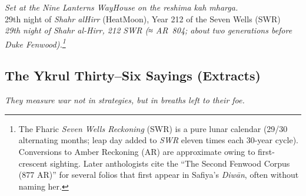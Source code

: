 \documentclass[11pt]{article}
\begin{document}
\begin{flushright}\small
\textit{Set at the Nine Lanterns Way\textendash House on the \emph{reshima kah mharga}.}\\
29th night of \emph{Shahr al\textendash Hirr} (Heat\textendash Moon), Year 212 of the Seven Wells (SWR)\\
	\textit{29th night of Shahr al-Hirr, 212 \textsc{SWR} (≈ AR~804; about two generations before Duke Fenwood).\footnote{The Fharic \emph{Seven Wells Reckoning} (SWR) is a pure lunar calendar (29/30 alternating months; leap day added to \emph{SWR} eleven times each 30-year cycle). Conversions to Amber Reckoning (AR) are approximate owing to first-crescent sighting. Later anthologists cite the “The Second Fenwood Corpus (877 AR)” for several folios that first appear in Safiya’s \emph{Diwān}, often without naming her.}}
\end{flushright}

\clearpage

\subsection*{The Ykrul Thirty--Six Sayings \textnormal{(Extracts)}}
\noindent\emph{They measure war not in strategies, but in breaths left to their foe.}
\end{document}
